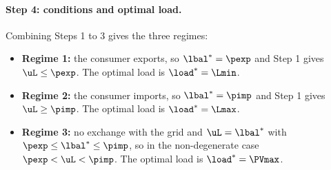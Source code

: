 \paragraph{Step 4: conditions and optimal load.}
Combining Steps 1 to 3 gives the three regimes:
\begin{itemize}
    \item \textbf{Regime 1:} the consumer exports, so ${\lbal}^* = \pexp$ and Step 1 gives
    $\uL \leq \pexp$. The optimal load is ${\load}^* = \Lmin$.
    \item \textbf{Regime 2:} the consumer imports, so ${\lbal}^* = \pimp$ and Step 1 gives
    $\uL \geq \pimp$. The optimal load is ${\load}^* = \Lmax$.
    \item \textbf{Regime 3:} no exchange with the grid and $\uL = {\lbal}^*$ with
    $\pexp \leq {\lbal}^* \leq \pimp$, so in the non-degenerate case
    $\pexp < \uL < \pimp$. The optimal load is ${\load}^* = \PVmax$.
\end{itemize}


